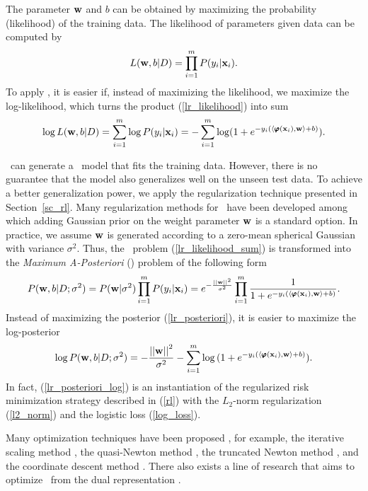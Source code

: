{%
The parameter $\mathbf {w}$ and $b$ can be obtained by maximizing the probability (likelihood) of the training data.
The likelihood of parameters given data can be computed by
\begin{align}
	L(\mathbf {w},b|D) = \prod_{i=1}^mP(y_i|\mathbf {x}_i). \label{lr_likelihood}
\end{align}
To apply \mle, it is easier if, instead of maximizing the likelihood, we maximize the log-likelihood, which turns the product (\ref{lr_likelihood}) into sum
\begin{align}
	\log L(\mathbf {w},b|D) = \sum_{i=1}^{m}\log P(y_i|\mathbf {x}_i) = -\sum_{i=1}^{m}\log (1+e^{ -y_i(\langle \pmb \varphi(\mathbf {x}_i), \mathbf {w} \rangle+b) }) \label{lr_likelihood_sum}.
\end{align}

\mle\ can generate a \lr\ model that fits the training data.
However, there is no guarantee that the model also generalizes well on the unseen test data.
To achieve a better generalization power, we apply the regularization technique presented in Section~\ref{sc_rl}.
Many regularization methods for \lr\ have been developed \citep{Chen99,Chen00,Goodman03} among which adding Gaussian prior on the weight parameter $\mathbf {w}$ is a standard option.
In practice, we assume $\mathbf {w}$ is generated according to a zero-mean spherical Gaussian with variance $\sigma^2$.
Thus, the \mle\ problem (\ref{lr_likelihood_sum}) is transformed into the \textit{Maximum A-Posteriori} (\map) problem of the following form
\begin{align}
	P(\mathbf {w},b|D;\sigma^2) = P(\mathbf {w}|\sigma^2)\prod_{i=1}^mP(y_i|\mathbf {x}_i)=e^{ -\frac{\left|\left| \mathbf {w} \right|\right|^2}{\sigma^2} }\prod_{i=1}^{m}{\frac{1}{1+e^{ -y_i(\langle \pmb \varphi(\mathbf {x}_i), \mathbf {w} \rangle+b) }}}. \label{lr_posteriori}
\end{align}
Instead of maximizing the posterior (\ref{lr_posteriori}), it is easier to maximize the log-posterior
\begin{align}
	\log P(\mathbf {w},b|D;\sigma^2) = -{\frac{\left|\left| \mathbf {w} \right|\right|^2}{\sigma^2}} - \sum_{i=1}^{m}\log{(1+e^{ -y_i(\langle \pmb \varphi(\mathbf {x}_i), \mathbf {w}\rangle+b) })}. \label{lr_posteriori_log}
\end{align}
In fact, (\ref{lr_posteriori_log}) is an instantiation of the regularized risk minimization strategy described in (\ref{rl}) with the $L_2$-norm regularization (\ref{l2_norm}) and the logistic loss (\ref{log_loss}).

Many optimization techniques have been proposed \citep{Minka03}, for example, 
the {iterative scaling} method \citep{Darroch72,Pietra97inducing,Berger97,Goodman02Sequential,Jin03a},
the quasi-Newton method \citep{Minka03},
the truncated Newton method \citep{Komarek05making,Lin2008trust},
and the coordinate descent method \citep{Huang09iterative}.
There also exists a line of research that aims to optimize \lr\ from the dual representation \citep{Jaakkola99probabilistic,Keerthi05a,Yu11dual}.




}
